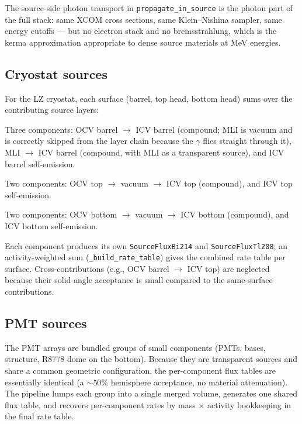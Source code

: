 \documentclass[11pt]{article}
\begin{document}
The source-side photon transport in \texttt{propagate\_in\_source} is the
photon part of the full stack: same XCOM cross sections, same Klein--Nishina
sampler, same energy cutoffs --- but no electron stack and no bremsstrahlung,
which is the kerma approximation appropriate to dense source materials at
MeV energies.

\subsection{Cryostat sources}
\label{sec:source-cryostat}

For the LZ cryostat, each surface (barrel, top head, bottom head) sums over
the contributing source layers:

\begin{description}[leftmargin=2.0cm,style=nextline]
\item[Barrel] Three components: OCV barrel $\to$ ICV barrel (compound; MLI
is vacuum and is correctly skipped from the layer chain because the $\gamma$
flies straight through it), MLI $\to$ ICV barrel (compound, with MLI as a
transparent source), and ICV barrel self-emission.
\item[Top head] Two components: OCV top $\to$ vacuum $\to$ ICV top
(compound), and ICV top self-emission.
\item[Bottom head] Two components: OCV bottom $\to$ vacuum $\to$ ICV bottom
(compound), and ICV bottom self-emission.
\end{description}

Each component produces its own \texttt{SourceFluxBi214} and
\texttt{SourceFluxTl208}; an activity-weighted sum (\texttt{\_build\_rate\_table})
gives the combined rate table per surface. Cross-contributions
(e.g., OCV barrel $\to$ ICV top) are neglected because their solid-angle
acceptance is small compared to the same-surface contributions.

\subsection{PMT sources}
\label{sec:source-pmt}

The PMT arrays are bundled groups of small components (PMTs, bases,
structure, R8778 dome on the bottom). Because they are transparent sources
and share a common geometric configuration, the per-component flux tables
are essentially identical (a $\sim 50\%$ hemisphere acceptance, no material
attenuation). The pipeline lumps each group into a single merged volume,
generates one shared flux table, and recovers per-component rates by
mass$\,\times\,$activity bookkeeping in the final rate table.
\end{document}
